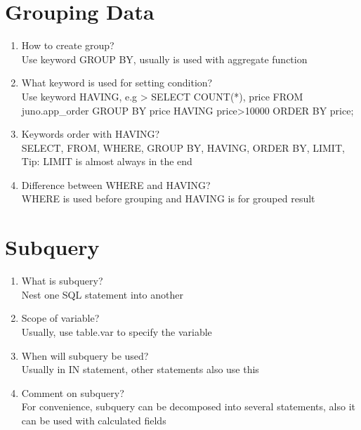 \documentclass[10pt,a4paper,oneside]{article}
\begin{document}
\section{Grouping Data}
\begin{enumerate}[1.]
\item How to create group?   \\
Use keyword GROUP BY, usually is used with aggregate function
\item  What keyword is used for setting condition?  \\
Use keyword HAVING, e.g > SELECT COUNT(*), price FROM juno.app\_order GROUP BY price HAVING price>10000 ORDER BY price;
\item  Keywords order with HAVING?  \\
SELECT, FROM, WHERE, GROUP BY, HAVING, ORDER BY, LIMIT, Tip: LIMIT is almost always in the end 
\item   Difference between WHERE and HAVING? \\
WHERE is used before grouping and HAVING is for grouped result
\end{enumerate}
\section{Subquery}
\begin{enumerate}[1.]
\item What is subquery?   \\
Nest one SQL statement into another
\item  Scope of variable?  \\
Usually, use table.var to specify the variable
\item  When will subquery be used?  \\
Usually in IN statement, other statements also use this
\item Comment on subquery?   \\
For convenience, subquery can be decomposed into several statements, also it can be used with calculated fields
\end{enumerate}
\end{document}

